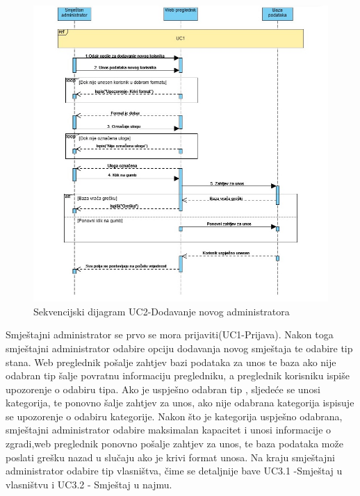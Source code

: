 				\begin{figure}[H]
					\includegraphics[width=\linewidth]{slike/DentAll-Sekvencijski-uc2-Dodavanje_novog_administratora.jpeg}
					\centering
					\caption{Sekvencijski dijagram UC2-Dodavanje novog administratora}
					\label{fig:Sekvencijski dijagram UC2}
				\end{figure}
				
				\newpage
				
				
				
				{Smještajni administrator se prvo se mora prijaviti(UC1-Prijava). Nakon toga smještajni administrator odabire opciju dodavanja novog smještaja te odabire tip stana. Web preglednik pošalje zahtjev bazi podataka za unos te baza ako nije odabran tip šalje povratnu informaciju pregledniku, a preglednik korisniku ispiše upozorenje o odabiru tipa. Ako je uspješno odabran tip , sljedeće se unosi kategorija, te ponovno šalje zahtjev za unos, ako nije odabrana kategorija ispisuje se upozorenje o odabiru kategorije. Nakon što je kategorija uspješno odabrana, smještajni administrator odabire maksimalan kapacitet i unosi informacije o zgradi,web preglednik ponovno pošalje zahtjev za unos, te baza podataka može poslati grešku nazad u slučaju ako je krivi format unosa. Na kraju smještajni administrator odabire tip vlasništva, čime se detaljnije bave UC3.1 -Smještaj u vlasništvu i UC3.2 - Smještaj u najmu.}
				
